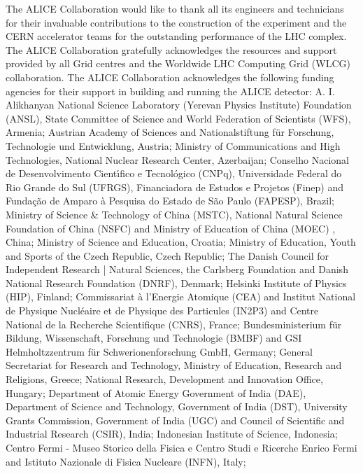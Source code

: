 
The ALICE Collaboration would like to thank all its engineers and technicians for their invaluable contributions to the construction of the experiment and the CERN accelerator teams for the outstanding performance of the LHC complex.
%
The ALICE Collaboration gratefully acknowledges the resources and support provided by all Grid centres and the Worldwide LHC Computing Grid (WLCG) collaboration.
%
The ALICE Collaboration acknowledges the following funding agencies for their support in building and running the ALICE detector:
%
A. I. Alikhanyan National Science Laboratory (Yerevan Physics Institute) Foundation (ANSL), State Committee of Science and World Federation of Scientists (WFS), Armenia;
%
Austrian Academy of Sciences and Nationalstiftung f\"{u}r Forschung, Technologie und Entwicklung, Austria;
%
Ministry of Communications and High Technologies, National Nuclear Research Center, Azerbaijan;
%
Conselho Nacional de Desenvolvimento Cient\'{\i}fico e Tecnol\'{o}gico (CNPq), Universidade Federal do Rio Grande do Sul (UFRGS), Financiadora de Estudos e Projetos (Finep) and Funda\c{c}\~{a}o de Amparo \`{a} Pesquisa do Estado de S\~{a}o Paulo (FAPESP), Brazil;
%
Ministry of Science \& Technology of China (MSTC), National Natural Science Foundation of China (NSFC) and Ministry of Education of China (MOEC) , China;
%
Ministry of Science and Education, Croatia;
%
Ministry of Education, Youth and Sports of the Czech Republic, Czech Republic;
%
The Danish Council for Independent Research | Natural Sciences, the Carlsberg Foundation and Danish National Research Foundation (DNRF), Denmark;
%
Helsinki Institute of Physics (HIP), Finland;
%
Commissariat \`{a} l'Energie Atomique (CEA) and Institut National de Physique Nucl\'{e}aire et de Physique des Particules (IN2P3) and Centre National de la Recherche Scientifique (CNRS), France;
%
Bundesministerium f\"{u}r Bildung, Wissenschaft, Forschung und Technologie (BMBF) and GSI Helmholtzzentrum f\"{u}r Schwerionenforschung GmbH, Germany;
%
General Secretariat for Research and Technology, Ministry of Education, Research and Religions, Greece;
%
National Research, Development and Innovation Office, Hungary;
%
Department of Atomic Energy Government of India (DAE), Department of Science and Technology, Government of India (DST), University Grants Commission, Government of India (UGC) and Council of Scientific and Industrial Research (CSIR), India;
%
Indonesian Institute of Science, Indonesia;
%
Centro Fermi - Museo Storico della Fisica e Centro Studi e Ricerche Enrico Fermi and Istituto Nazionale di Fisica Nucleare (INFN), Italy;

